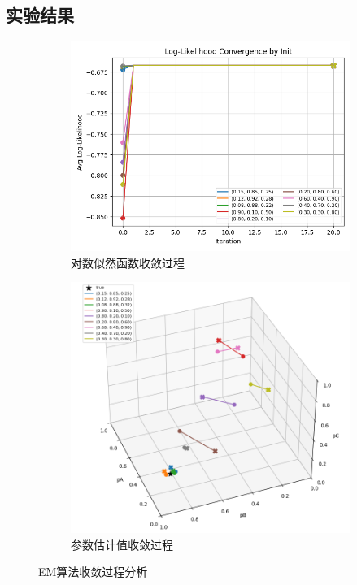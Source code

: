 \documentclass[12pt,a4paper]{article}
\begin{document}
\subsection{实验结果}
\begin{figure}[H]
\centering
\begin{subfigure}{0.48\textwidth}
\centering
\includegraphics[width=\textwidth]{../images/Figure_2.png}
\caption{对数似然函数收敛过程}
\label{fig:likelihood_convergence}
\end{subfigure}
\hfill
\begin{subfigure}{0.48\textwidth}
\centering
\includegraphics[width=\textwidth]{../images/Figure_1.png}
\caption{参数估计值收敛过程}
\label{fig:parameter_convergence}
\end{subfigure}
\caption{EM算法收敛过程分析}
\label{fig:em_convergence}
\end{figure}
\end{document}
